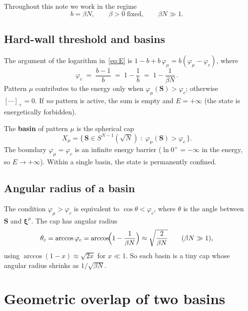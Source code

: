 \documentclass[11pt]{article}
\newcommand{\vp}{\varphi}
\newcommand{\bS}{\mathbf{S}}
\newcommand{\bxi}{\boldsymbol{\xi}}
\begin{document}
Throughout this note we work in the regime
\begin{equation}\label{eq:b_regime}
  b = \beta N, \qquad \beta > 0 \;\text{fixed},
  \qquad \beta N \gg 1.
\end{equation}


\subsection{Hard-wall threshold and basins}

The argument of the logarithm in~\eqref{eq:E} is
$1 - b + b\,\vp_\mu = b(\vp_\mu - \vp_c)$,
where
\begin{equation}\label{eq:phic}
  \vp_c \;=\; \frac{b-1}{b} \;=\; 1 - \frac{1}{b}
  \;=\; 1 - \frac{1}{\beta N}\,.
\end{equation}
Pattern $\mu$ contributes to the energy only when
$\vp_\mu(\bS) > \vp_c$; otherwise $[\cdots]_+ = 0$.
If \emph{no} pattern is active, the sum is empty and
$E = +\infty$ (the state is energetically forbidden).

The \textbf{basin} of pattern $\mu$ is the spherical cap
\begin{equation}\label{eq:basin}
  X_\mu = \bigl\{\, \bS \in S^{N-1}(\sqrt{N})
  \;:\; \vp_\mu(\bS) > \vp_c \,\bigr\}.
\end{equation}
The boundary $\vp_\mu = \vp_c$ is an infinite energy barrier
($\ln 0^+ = -\infty$ in the energy, so $E \to +\infty$).
Within a single basin, the state is permanently confined.


\subsection{Angular radius of a basin}

The condition $\vp_\mu > \vp_c$ is equivalent to
$\cos\theta < \vp_c$, where $\theta$ is the angle between
$\bS$ and $\bxi^\mu$.  The cap has angular radius
\begin{equation}\label{eq:thetac}
  \theta_c = \arccos\vp_c
  = \arccos\!\Bigl(1 - \frac{1}{\beta N}\Bigr)
  \approx \sqrt{\frac{2}{\beta N}}
  \qquad (\beta N \gg 1),
\end{equation}
using $\arccos(1 - x) \approx \sqrt{2x}$ for $x \ll 1$.
So each basin is a tiny cap whose angular radius shrinks as
$1/\sqrt{\beta N}$.


\section{Geometric overlap of two basins}
\label{sec:geom_overlap}
\end{document}
